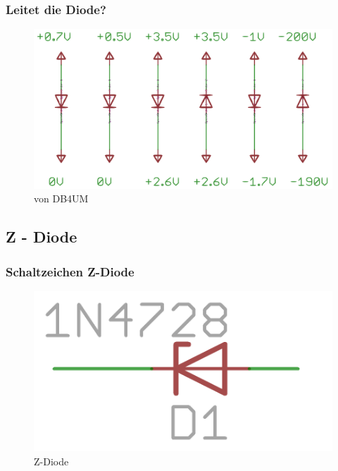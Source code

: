 \begin{frame}
  \frametitle{Leitet die Diode?}
  \begin{center}
    \begin{figure}
      \includegraphics[width=1\textwidth,height=.75\textheight,keepaspectratio]{e12/Leit_Diode.png}
      \caption{von DB4UM}
    \end{figure}
  \end{center}
\end{frame}


\subsection*{Z - Diode}

\begin{frame}
  \frametitle{Schaltzeichen Z-Diode}
  \begin{center}
    \begin{figure}
      \includegraphics[width=.8\textwidth,height=.75\textheight,keepaspectratio]{e12/z-diode.png}
      \caption{Z-Diode}
    \end{figure}
  \end{center}
\end{frame}

